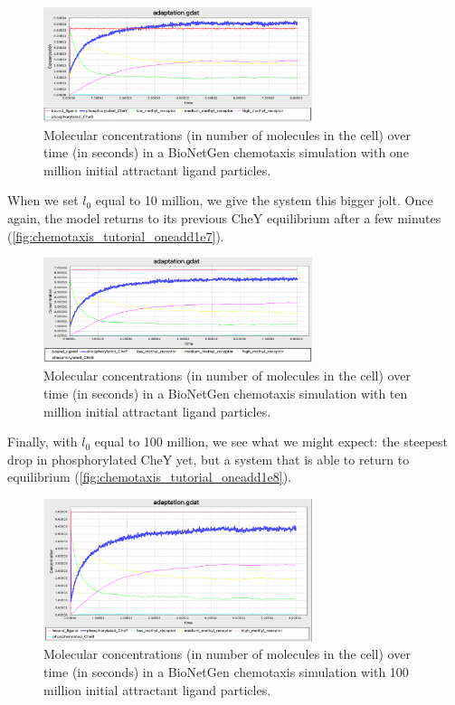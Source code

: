 \begin{figure}[h]
\centering
\mySfFamily
\includegraphics[width = 0.7\textwidth]{../images/chemotaxis_tutorial_oneadd1e6.png}
\caption{Molecular concentrations (in number of molecules in the cell) over time (in seconds) in a BioNetGen chemotaxis simulation with one million initial attractant ligand particles.}
\label{fig:chemotaxis_tutorial_oneadd16}
\end{figure}

When we set $l_0$ equal to 10 million, we give the system this bigger jolt. Once again, the model returns to its previous CheY equilibrium after a few minutes (\autoref{fig:chemotaxis_tutorial_oneadd1e7}).

\begin{figure}[h]
\centering
\mySfFamily
\includegraphics[width = 0.7\textwidth]{../images/chemotaxis_tutorial_oneadd1e7.png}
\caption{Molecular concentrations (in number of molecules in the cell) over time (in seconds) in a BioNetGen chemotaxis simulation with ten million initial attractant ligand particles.}
\label{fig:chemotaxis_tutorial_oneadd1e7}
\end{figure}

Finally, with $l_0$ equal to 100 million, we see what we might expect: the steepest drop in phosphorylated CheY yet, but a system that is able to return to equilibrium (\autoref{fig:chemotaxis_tutorial_oneadd1e8}).

\begin{figure}[h]
\centering
\mySfFamily
\includegraphics[width = 0.7\textwidth]{../images/chemotaxis_tutorial_oneadd1e8.png}
\caption{Molecular concentrations (in number of molecules in the cell) over time (in seconds) in a BioNetGen chemotaxis simulation with 100 million initial attractant ligand particles.}
\label{fig:chemotaxis_tutorial_oneadd1e8}
\end{figure}

